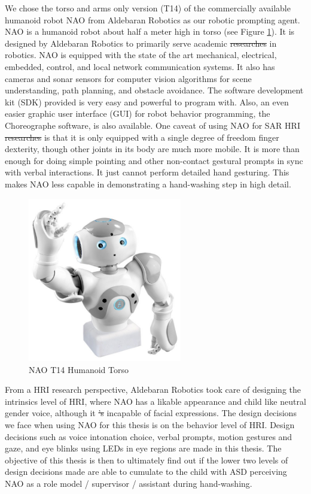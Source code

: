 \documentclass{ut-thesis}
\providecommand{\DIFaddtex}[1]{{\protect\color{blue}\uwave{#1}}} %
\providecommand{\DIFdeltex}[1]{{\protect\color{red}\sout{#1}}}                      %
\providecommand{\DIFaddbegin}{} %
\providecommand{\DIFaddend}{} %
\providecommand{\DIFdelbegin}{} %
\providecommand{\DIFdelend}{} %
\providecommand{\DIFadd}[1]{\texorpdfstring{\DIFaddtex{#1}}{#1}} %
\providecommand{\DIFdel}[1]{\texorpdfstring{\DIFdeltex{#1}}{}} %
\begin{document}
We chose the torso and arms only version (T14) of the commercially available humanoid robot NAO from Aldebaran Robotics as our robotic prompting agent.  NAO is a humanoid robot about half a meter high in torso (see Figure \ref{fig:NAOColor}).  It is designed by Aldebaran Robotics to primarily serve academic \DIFdelbegin \DIFdel{researches }\DIFdelend \DIFaddbegin \DIFadd{research }\DIFaddend in robotics.  NAO is equipped with the state of the art mechanical, electrical, embedded, control, and local network communication systems.  It also has cameras and sonar sensors for computer vision algorithms for scene understanding, path planning, and obstacle avoidance.  The software development kit (SDK) provided is very easy and powerful to program with.  Also, an even easier graphic user interface (GUI) for robot behavior programming, the Choreographe software, is also available.  One caveat of using NAO for SAR HRI \DIFdelbegin \DIFdel{researches }\DIFdelend \DIFaddbegin \DIFadd{research }\DIFaddend is that it is only equipped with a single degree of freedom finger dexterity, though other joints in its body are much more mobile.  It is more than enough for doing simple pointing and other non-contact gestural prompts in sync with verbal interactions.  It just cannot perform detailed hand gesturing.  This makes NAO less capable in demonstrating a hand-washing step in high detail.
\begin{figure} [h]
	\centering
	\includegraphics[width=0.6\textwidth]{./img/nao-torso.jpg}
	\caption{NAO T14 Humanoid Torso}
	\label{fig:NAOColor}
\end{figure}


From a HRI research perspective, Aldebaran Robotics took care of designing the intrinsics level of HRI, where NAO has a likable appearance and child like neutral gender voice, although it \DIFdelbegin \DIFdel{'s }\DIFdelend \DIFaddbegin \DIFadd{is }\DIFaddend incapable of facial expressions.  The design decisions we face when using NAO for this thesis is on the behavior level of HRI.  Design decisions such as voice intonation choice, verbal prompts, motion gestures and gaze, and eye blinks using LEDs in eye regions are made in this thesis.  The objective of this thesis is then to ultimately find out if the lower two levels of design decisions made are able to cumulate to the child with ASD perceiving NAO as a role model / supervisor / assistant during hand-washing.
\end{document}
